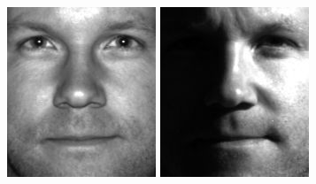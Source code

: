 \documentclass[times, utf8, seminar, numeric]{fer}
\begin{document}
\begin{figure}[!htb]
  \includegraphics[width=\linewidth]{raw/yaleB03_P00A+000E+00.jpg}
\endminipage\hfill
{}
  \includegraphics[width=\linewidth]{raw/yaleB03_P00A-060E+20.jpg}

\end{figure}
\end{document}

